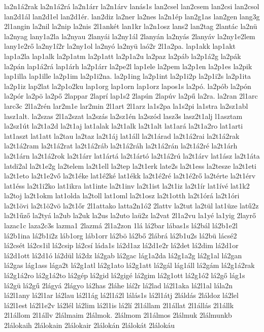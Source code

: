 {la2n1á2rak
la2n1á2rá
la2n1árr
la2n1árv
lanás1s
lan2csel
lan2csem
lan2csi
lan2csol
lan2d1ál
lan2d1el
lan2d1ér.
lan2diz
la2ner
la2nes
la2n1ép
lan2g1as
lan2gen
lang3g
2l1angin
la2nil
la2nip
la2nis
2l1ankét
lan1kr
la2n1osz
lans2
lan2tag
2lantác
la2nü
la2nyag
lany1a2la
la2nyau
2lanyái
la2ny1ál
2lanyán
la2nyás
2lanyáv
la2ny1e2lem
lany1e2rő
la2ny1í2r
la2ny1ol
la2nyó
la2nyü
laó2r
2l1a2pa.
lap1akk
lap1akt
lap1a2la
lap1alk
la2p1atm
la2p1att
la2p1a2u
la2paz
la2páb
la2p1á2g
la2pák
la2pán
lap1á2rá
lap1árh
la2p1árr
la2pe2l
lap1ele
la2pem
la2p1en
la2p1es
la2pik
lap1illa
lap1ille
la2p1im
la2p1i2na.
la2p1ing
la2p1int
la2p1i2p
la2p1i2s
la2p1ita
la2p1iz
lap2lat
la2p1o2ku
lap1org
lap1orn
lap1orz
lapos1s
la2pó.
la2pób
la2pón
la2pór
la2pö
la2pő
2lappar
2laprí
lap1s2
2lapún
2lapúv
la2pű
la2ra.
la2ran
2l1arc
larc3c
2l1a2rén
lar2m1e
lar2min
2l1art
2l1arz
la1s2pa
la1s2pi
la1stra
la2sz1abl
lasz1alt.
la2szas
2l1a2szat
la2szás
la2sz1én
la2szód
lasz3s
lasz2t1alj
l1asztam
la2sz1út
la2t1a2d
la2t1aj
lat1alak
la2t1alk
la2t1alt
lat1ará
la2t1a2ro
lat1arti
lat1aszt
lat1att
la2tau
la2taz
la2t1áj
lat1áll
la2t1árad
la2t1á2rai
la2t1á2rak
la2t1á2ram
la2t1á2rat
la2t1á2ráb
la2t1á2ráh
la2t1á2rán
la2t1á2ré
la2t1árh
la2t1árn
la2t1á2rok
la2t1árr
lat1ártá
la2t1ártó
la2t1á2rú
la2t1árv
lat1ász
la2t1áta
latdi2al
la2t1e2g
la2telem
la2t1ell
la2tep
la2t1erk
late2s
la2t1ess
la2tesze
la2t1eti
la2t1eto
la2t1e2vő
la2t1éke
lat1é2ké
lat1ékk
la2t1é2ré
la2t1é2rő
la2térte
la2t1érv
lat1éss
la2t1i2ko
lat1ikra
lat1inte
la2t1inv
la2t1ist
la2t1iz
la2t1ír
lat1ívé
lat1k2
la2toj
la2t1okm
lat1olda
la2toll
lat1oml
la2t1osz
la2t1otth
la2t1órá
la2t1óri
la2t1övi
la2t1ö2vö
la2t1őr
2l1attako
latta2n1ó2
2lattv
la2tut
la2tül
lat1üze
latű2z
la2t1űző
la2tyá
la2ub
la2uk
la2us
la2uto
laü2z
la2vat
2l1a2vu
la1yé
la1yig
2layrő
lazac1c
laza2c3s
lazma1
2lazmá
2l1a2zon
1lá
lá2bar
lábas1s
lá2bál
lá2b1e2l
lá2b1ina
lá2b1i2z
láb1org
láb1orr
lá2bö
lá2bő
2lábrá
lá2b1u2s
lá2bü
lácsé2
lá2csét
lá2cs1il
lá2csip
lá2csí
láda1s
lá2d1az
lá2d1e2r
lá2det
lá2dim
lá2d1or
lá2d1ott
lá2d1ó
lá2dül
lá2dz
lá2gab
lá2gac
lág1a2da
lá2g1a2g
lá2g1al
lá2gan
lá2gas
lág1ass
lága2t
lá2g1atl
lá2g1ato
lá2g1att
lá2gál
lág1áll
lá2gám
lá2g1á2rak
lá2g1á2ro
lá2g1á2to
lá2gép
lá2gid
lá2gigé
lá2gim
lá2g1ott
lá2g1ó2
lá2gő
lág1s
lá2gü
lá2gű
2lágyá
2lágyo
lá2has
2láhe
láí2r
lá2lad
lá2l1aka
lá2l1al
lála2n
lá2l1any
lá2l1ar
lá2lau
lá2l1ág
lá2l1á2l
lálás1s
lá2l1átj
2láldás
2láldoz
lá2lel
lá2l1est
lá2l1e2v
lá2lél
lá2lim
lá2l1is
lá2lí
2l1állam
2l1állat
2l1állás
2l1állk
2l1állom
2l1állv
2lálmaim
2lálmok.
2lálmom
2l1álmos
2lálmuk
2lálmunkb
2lálokaih
2lálokain
2lálokair
2lálokán
2lálokát
2lálokáu
}
